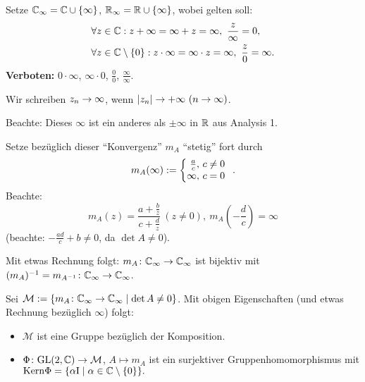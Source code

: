 \documentclass[a4paper,twoside,DIV15,BCOR12mm]{scrbook}
\begin{document}
\begin{dfn} \label{dfn1.10}
  Setze $\mathbb{C}_\infty = \mathbb{C} \cup \{\infty\}$, $\mathbb{R}_\infty = \mathbb{R} \cup \{\infty\}$, wobei gelten soll:
\begin{eqnarray*}
&\forall z\in\mathbb{C}: z+\infty = \infty + z = \infty,\ \frac{z}{\infty} = 0,\\
&\forall z\in\mathbb{C}\setminus \{0\}: z\cdot\infty = \infty\cdot z = \infty,\ \frac{z}{0} = \infty.
\end{eqnarray*}
\textbf{Verboten:} $0\cdot\infty$, $\infty\cdot 0$, $\frac{0}{0}$, $\frac{\infty}{\infty}$.

\noindent Wir schreiben $z_n \rightarrow \infty$, wenn $\abs{z_n} \ra +\infty\ (n\ra\infty)$.

\noindent Beachte: Dieses $\infty$ ist ein anderes als $\pm\infty$ in $\mathbb{R}$ aus Analysis 1.
\end{dfn}

Setze bezüglich dieser ``Konvergenz'' $m_A$ ``stetig'' fort durch
\[m_A (\infty) \da \left\{\!\!\!\begin{array}{r @{,\ } l}\frac{a}{c}&c\neq 0\\\infty&c=0\end{array}\right..\]
Beachte:
\[m_A(z)=\frac{a+\frac{b}{z}}{c+\frac{d}{z}}\ (z\neq 0),\ m_A\left(-\frac{d}{c}\right) = \infty\]
(beachte: $-\frac{ad}{c} + b\neq 0$, da $\det A\neq 0$).

Mit etwas Rechnung folgt: $m_A\colon\mathbb{C}_\infty\rightarrow\mathbb{C}_\infty$ ist bijektiv mit $(m_A)^{-1} = m_{A^{-1}}\colon\mathbb{C}_\infty\rightarrow\mathbb{C}_\infty$.

Sei $\mathcal{M}:=\{m_A\colon\mathbb{C}_\infty\rightarrow\mathbb{C}_\infty\mid\det A\neq 0\}$. Mit obigen Eigenschaften (und etwas Rechnung bezüglich $\infty$) folgt:
\begin{itemize}
\item $\mathcal{M}$ ist eine Gruppe bezüglich der Komposition.
\item $\Phi\colon \mathrm{GL}(2,\mathbb{C})\rightarrow\mathcal{M}$, $A\mapsto m_A$ ist ein surjektiver Gruppenhomomorphismus mit
  $\mathrm{Kern }\Phi = \{\alpha \mathrm{I} \mid \alpha\in\mathbb{C}\setminus\{0\}\}.$
\end{itemize}
\end{document}
